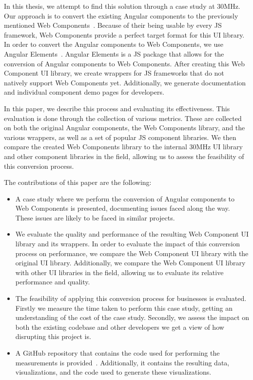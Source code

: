 In this thesis, we attempt to find this solution through a case study at 30MHz. Our approach is to convert the existing Angular components to the previously mentioned Web Components~. Because of their being usable by every JS framework, Web Components provide a perfect target format for this UI library. In order to convert the Angular components to Web Components, we use Angular Elements~. Angular Elements is a JS package that allows for the conversion of Angular components to Web Components. After creating this Web Component UI library, we create wrappers for JS frameworks that do not natively support Web Components yet. Additionally, we generate documentation and individual component demo pages for developers.

In this paper, we describe this process and evaluating its effectiveness. This evaluation is done through the collection of various metrics. These are collected on both the original Angular components, the Web Components library, and the various wrappers, as well as a set of popular JS component libraries. We then compare the created Web Components library to the internal 30MHz UI library and other component libraries in the field, allowing us to assess the feasibility of this conversion process.

The contributions of this paper are the following:

\begin{itemize}
	\item A case study where we perform the conversion of Angular components to Web Components is presented, documenting issues faced along the way. These issues are likely to be faced in similar projects.
	\item We evaluate the quality and performance of the resulting Web Component UI library and its wrappers. In order to evaluate the impact of this conversion process on performance, we compare the Web Component UI library with the original UI library. Additionally, we compare the Web Component UI library with other UI libraries in the field, allowing us to evaluate its relative performance and quality.
	\item The feasibility of applying this conversion process for businesses is evaluated. Firstly we measure the time taken to perform this case study, getting an understanding of the cost of the case study. Secondly, we assess the impact on both the existing codebase and other developers we get a view of how disrupting this project is.
	\item A GitHub repository that contains the code used for performing the measurements is provided~. Additionally, it contains the resulting data, visualizations, and the code used to generate these visualizations.
\end{itemize}